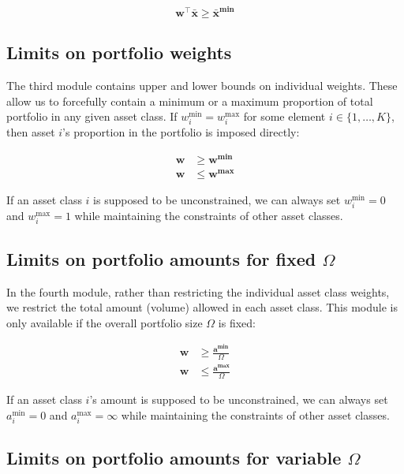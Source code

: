 \begin{equation}
\mathbf{w}^\top \mathbf{\bar{x}} \geq \mathbf{\bar{x}^{\min}}  \tag{M2} \label{eq:portfolio_optimization:M2}
\end{equation}


\subsection{Limits on portfolio weights}


The third module contains upper and lower bounds on individual weights. These allow us to forcefully contain a minimum or a maximum proportion of total portfolio in any given asset class. If $w^{\min}_i = w^{\max}_i$ for some element $i\in\{1,\ldots,K\}$, then asset $i$'s proportion in the portfolio is imposed directly:

\begin{align}
\mathbf{w}&\geq\mathbf{w^{\min}} \tag{M3a} \label{eq:portfolio_optimization:M3a}\\ 
\mathbf{w}&\leq\mathbf{w^{\max}} \tag{M3b} \label{eq:portfolio_optimization:M3b}
\end{align}

If an asset class $i$ is supposed to be unconstrained, we can always set $w^{\min}_i = 0$ and $w^{\max}_i = 1$ while maintaining the constraints of other asset classes.

\subsection{Limits on portfolio amounts for fixed $\Omega$}


In the fourth module, rather than restricting the individual asset class weights, we restrict the total amount (volume) allowed in each asset class. This module is only available if the overall portfolio size $\Omega$ is fixed:

\begin{align}
\mathbf{w}&\geq\frac{\mathbf{a^{\min}}}{\Omega} \tag{M4Fa} \label{eq:portfolio_optimization:M4Fa}\\ 
\mathbf{w}&\leq\frac{\mathbf{a^{\max}}}{\Omega} \tag{M4Fb} \label{eq:portfolio_optimization:M4Fb}
\end{align}

If an asset class $i$'s amount is supposed to be unconstrained, we can always set $a^{\min}_i = 0$ and $a^{\max}_i = \infty$ while maintaining the constraints of other asset classes.

\subsection{Limits on portfolio amounts for variable $\Omega$}

